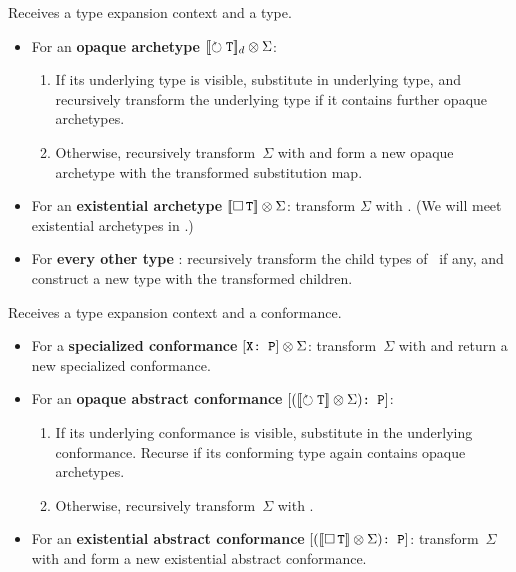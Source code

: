 \documentclass[../generics]{subfiles}
\begin{document}
\begin{algorithm}\label{unwrap opaque type algorithm}
Receives a type expansion context and a type.
\begin{itemize}
\item For an \textbf{opaque archetype} $[\![\circlearrowright \texttt{\texttt{T}}]\!]_d \otimes \Sigma$:
\begin{enumerate}
\item If its underlying type is visible, substitute in underlying type, and recursively transform the underlying type if it contains further opaque archetypes.
\item Otherwise, recursively transform~$\Sigma$ with  and form a new opaque archetype with the transformed substitution map.
\end{enumerate}

\item For an \textbf{existential archetype} $[\![\Box\,\texttt{T}]\!] \otimes \Sigma$:  transform $\Sigma$ with . (We will meet existential archetypes in .)

\item For \textbf{every other type} \tX: recursively transform the child types of \tX\ if any, and construct a new type with the transformed children.
\end{itemize}
\end{algorithm}

\begin{algorithm}\label{unwrap opaque conformance algorithm}
Receives a type expansion context and a conformance.
\begin{itemize}
\item For a \textbf{specialized conformance} $[\texttt{X:~P}] \otimes \Sigma$: transform~$\Sigma$ with  and return a new specialized conformance.

\item For an \textbf{opaque abstract conformance} $[\texttt{$([\![\circlearrowright \texttt{\texttt{T}}]\!] \otimes \Sigma)$:~P}]$:
  \begin{enumerate}
  \item If its underlying conformance is visible, substitute in the underlying conformance. Recurse if its conforming type again contains opaque archetypes.
  \item Otherwise, recursively transform~$\Sigma$ with .
\end{enumerate}
\item For an \textbf{existential abstract conformance} $[\texttt{$([\![\Box\,\texttt{T}]\!] \otimes \Sigma)$:~P}]$: transform~$\Sigma$ with  and form a new existential abstract conformance.
\end{itemize}
\end{algorithm}
\end{document}
